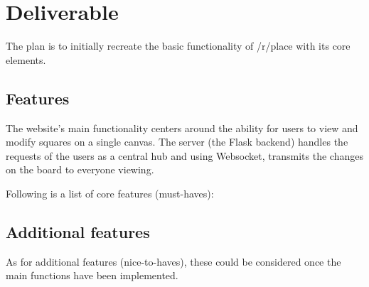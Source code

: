 \clearpage


\section{Deliverable}\label{sec:deliverable}

The plan is to initially recreate the basic functionality of /r/place with its core elements.

\subsection{Features}\label{subsec:features}

The website's main functionality centers around the ability for users to view and modify squares on a single canvas.
The server (the Flask backend) handles the requests of the users as a central hub and using Websocket, transmits the changes on the board to everyone viewing.

Following is a list of core features (must-haves):

\begin{table}[!h]
    \caption{Main features}
    \label{tab:mainFeatures}
\end{table}

\subsection{Additional features}\label{subsec:additional-features}

As for additional features (nice-to-haves), these could be considered once the main functions have been implemented.

\begin{table}[!h]
    \caption{Additional features}
    \label{tab:additionalFeatures}
\end{table}
